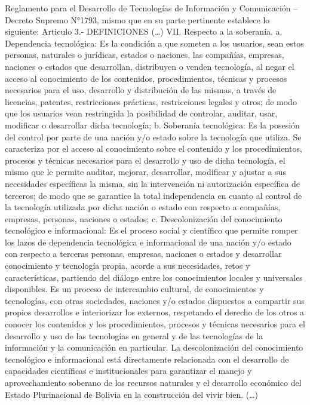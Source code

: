 Reglamento para el Desarrollo de Tecnologías de Información y Comunicación – Decreto Supremo N°1793, mismo que en su parte pertinente establece lo siguiente: Articulo 3.- DEFINICIONES (…) VII. Respecto a la soberanía. a. Dependencia tecnológica: Es la condición a que someten a los usuarios, sean estos personas, naturales o jurídicas, estados o naciones, las compañías, empresas, naciones o estados que desarrollan, distribuyen o venden tecnología, al negar el acceso al conocimiento de los contenidos, procedimientos, técnicas y procesos necesarios para el uso, desarrollo y distribución de las mismas, a través de licencias, patentes, restricciones prácticas, restricciones legales y otros; de modo que los usuarios vean restringida la posibilidad de controlar, auditar, usar, modificar o desarrollar dicha tecnología; b. Soberanía tecnológica: Es la posesión del control por parte de una nación y/o estado sobre la tecnología que utiliza. Se caracteriza por el acceso al conocimiento sobre el contenido y los procedimientos, procesos y técnicas necesarios para el desarrollo y uso de dicha tecnología, el mismo que le permite auditar, mejorar, desarrollar, modificar y ajustar a sus necesidades específicas la misma, sin la intervención ni autorización específica de terceros; de modo que se garantice la total independencia en cuanto al control de la tecnología utilizada por dicha nación o estado con respecto a compañías, empresas, personas, naciones o estados; c. Descolonización del conocimiento tecnológico e informacional: Es el proceso social y científico que permite romper los lazos de dependencia tecnológica e informacional de una nación y/o estado con respecto a terceras personas, empresas, naciones o estados y desarrollar conocimiento y tecnología propia, acorde a sus necesidades, retos y características, partiendo del diálogo entre los conocimientos locales y universales disponibles. Es un proceso de intercambio cultural, de conocimientos y tecnologías, con otras sociedades, naciones y/o estados dispuestos a compartir sus propios desarrollos e interiorizar los externos, respetando el derecho de los otros a conocer los contenidos y los procedimientos, procesos y técnicas necesarios para el desarrollo y uso de las tecnologías en general y de las tecnologías de la información y la comunicación en particular. La descolonización del conocimiento tecnológico e informacional está directamente relacionada con el desarrollo de capacidades científicas e institucionales para garantizar el manejo y aprovechamiento soberano de los recursos naturales y el desarrollo económico del Estado Plurinacional de Bolivia en la construcción del vivir bien. (…)
